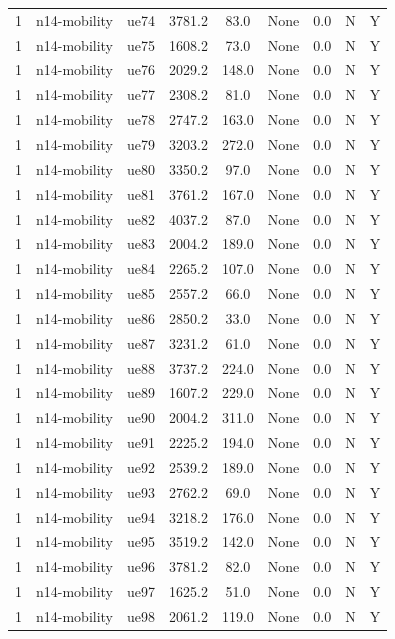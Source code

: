 \begin{table}[ht]
\begin{tabular}{|c|c|c|c|c|c|c|c|c|}
1 & n14-mobility & ue74 & 3781.2 & 83.0 & None & 0.0 & N & Y \\
1 & n14-mobility & ue75 & 1608.2 & 73.0 & None & 0.0 & N & Y \\
1 & n14-mobility & ue76 & 2029.2 & 148.0 & None & 0.0 & N & Y \\
1 & n14-mobility & ue77 & 2308.2 & 81.0 & None & 0.0 & N & Y \\
1 & n14-mobility & ue78 & 2747.2 & 163.0 & None & 0.0 & N & Y \\
1 & n14-mobility & ue79 & 3203.2 & 272.0 & None & 0.0 & N & Y \\
1 & n14-mobility & ue80 & 3350.2 & 97.0 & None & 0.0 & N & Y \\
1 & n14-mobility & ue81 & 3761.2 & 167.0 & None & 0.0 & N & Y \\
1 & n14-mobility & ue82 & 4037.2 & 87.0 & None & 0.0 & N & Y \\
1 & n14-mobility & ue83 & 2004.2 & 189.0 & None & 0.0 & N & Y \\
1 & n14-mobility & ue84 & 2265.2 & 107.0 & None & 0.0 & N & Y \\
1 & n14-mobility & ue85 & 2557.2 & 66.0 & None & 0.0 & N & Y \\
1 & n14-mobility & ue86 & 2850.2 & 33.0 & None & 0.0 & N & Y \\
1 & n14-mobility & ue87 & 3231.2 & 61.0 & None & 0.0 & N & Y \\
1 & n14-mobility & ue88 & 3737.2 & 224.0 & None & 0.0 & N & Y \\
1 & n14-mobility & ue89 & 1607.2 & 229.0 & None & 0.0 & N & Y \\
1 & n14-mobility & ue90 & 2004.2 & 311.0 & None & 0.0 & N & Y \\
1 & n14-mobility & ue91 & 2225.2 & 194.0 & None & 0.0 & N & Y \\
1 & n14-mobility & ue92 & 2539.2 & 189.0 & None & 0.0 & N & Y \\
1 & n14-mobility & ue93 & 2762.2 & 69.0 & None & 0.0 & N & Y \\
1 & n14-mobility & ue94 & 3218.2 & 176.0 & None & 0.0 & N & Y \\
1 & n14-mobility & ue95 & 3519.2 & 142.0 & None & 0.0 & N & Y \\
1 & n14-mobility & ue96 & 3781.2 & 82.0 & None & 0.0 & N & Y \\
1 & n14-mobility & ue97 & 1625.2 & 51.0 & None & 0.0 & N & Y \\
1 & n14-mobility & ue98 & 2061.2 & 119.0 & None & 0.0 & N & Y \\

\end{tabular}
\end{table}
